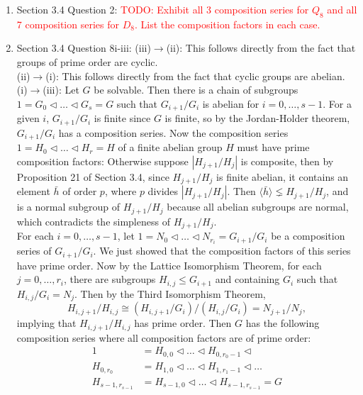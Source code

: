 \documentclass{article}
\newcommand{\TODO}[1]{\textcolor{red}{TODO: #1}}
\begin{document}
\begin{enumerate}
  \item Section 3.4 Question 2: \TODO{Exhibit all 3 composition series for
    $Q_8$ and all 7 composition series for $D_8$. List the composition
    factors in each case.}

  \item Section 3.4 Question 8i-iii: (iii)$\rightarrow$(ii): This follows
    directly from the fact that groups of prime order are cyclic. \\

    (ii)$\rightarrow$(i): This follows directly from the fact that cyclic
    groups are abelian. \\

    (i)$\rightarrow$(iii): Let $G$ be solvable. Then there is a chain of
    subgroups $1=G_0\triangleleft\ldots\triangleleft G_s=G$ such that
    $G_{i+1}/G_i$ is abelian for $i=0,\ldots,s-1$. For a given $i$,
    $G_{i+1}/G_i$ is finite since $G$ is finite, so by the Jordan-Holder
    theorem, $G_{i+1}/G_i$ has a composition series. Now the composition
    series $1=H_0\triangleleft\ldots\triangleleft H_r=H$ of a finite
    abelian group $H$ must have prime composition factors: Otherwise
    suppose $|H_{j+1}/H_j|$ is composite, then by Proposition 21 of Section
    3.4, since $H_{j+1}/H_j$ is finite abelian, it contains an element
    $\bar{h}$ of order $p$, where $p$ divides $|H_{j+1}/H_j|$. Then
    $\langle\bar{h}\rangle\lneq H_{j+1}/H_j$, and is a normal subgroup of
    $H_{j+1}/H_j$ because all abelian subgroups are normal, which
    contradicts the simpleness of $H_{j+1}/H_j$. \\

    For each $i=0,\ldots,s-1$, let $1=N_0\triangleleft\ldots\triangleleft
    N_{r_i}=G_{i+1}/G_i$ be a composition series of $G_{i+1}/G_i$. We just
    showed that the composition factors of this series have prime order.
    Now by the Lattice Isomorphism Theorem, for each $j=0,\ldots,r_i$,
    there are subgroups $H_{i,j}\leq G_{i+1}$ and containing $G_i$ such that
    $H_{i,j}/G_i=N_j$. Then by the Third Isomorphism Theorem,
    \begin{equation*}
      H_{i,j+1}/H_{i,j} \cong (H_{i,j+1}/G_i)/(H_{i,j}/G_i) = N_{j+1}/N_j,
    \end{equation*}
    implying that $H_{i,j+1}/H_{i,j}$ has prime order. Then $G$ has the
    following composition series where all composition factors are of prime
    order:
    \begin{align*}
      1         &=H_{0,0}\triangleleft\ldots\triangleleft
                  H_{0,r_0-1}\triangleleft  \\
      H_{0,r_0} &=H_{1,0}\triangleleft\ldots\triangleleft
                  H_{1,r_1-1}\triangleleft\ldots  \\
      H_{s-1,r_{s-1}} &=H_{s-1,0}\triangleleft\ldots\triangleleft
                  H_{s-1,r_{s-1}}=G \\
    \end{align*}


\end{enumerate}
\end{document}
